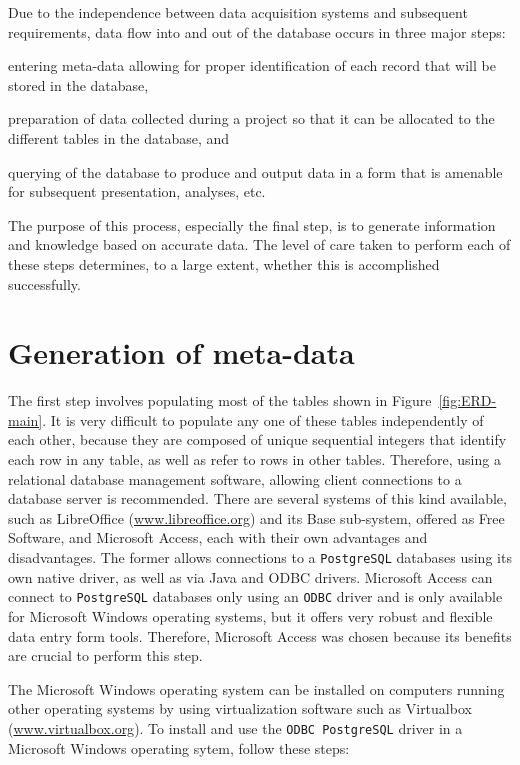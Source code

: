 \documentclass[12pt,letterpaper,titlepage,headings=small,numbers=noenddot]%
{scrartcl}
\begin{document}
Due to the independence between data acquisition systems and subsequent
requirements, data flow into and out of the database occurs in three major
steps:
\begin{inparaenum}[1)]
\item entering meta-data allowing for proper identification of each record
  that will be stored in the database,
\item preparation of data collected during a project so that it can be
  allocated to the different tables in the database, and
\item querying of the database to produce and output data in a form that is
  amenable for subsequent presentation, analyses, etc.
\end{inparaenum}

The purpose of this process, especially the final step, is to generate
information and knowledge based on accurate data.  The level of care taken
to perform each of these steps determines, to a large extent, whether this
is accomplished successfully.


\section{Generation of meta-data}
\label{sec:generation-meta-data}

The first step involves populating most of the tables shown in
Figure~\ref{fig:ERD-main}.  It is very difficult to populate any one of
these tables independently of each other, because they are composed of
unique sequential integers that identify each row in any table, as well as
refer to rows in other tables.  Therefore, using a relational database
management software, allowing client connections to a database server is
recommended.  There are several systems of this kind available, such as
LibreOffice (\url{www.libreoffice.org}) and its Base sub-system, offered as
Free Software, and Microsoft Access, each with their own advantages and
disadvantages.  The former allows connections to a \texttt{PostgreSQL}
databases using its own native driver, as well as via Java and ODBC
drivers.  Microsoft Access can connect to \texttt{PostgreSQL} databases
only using an \texttt{ODBC} driver and is only available for Microsoft
Windows operating systems, but it offers very robust and flexible data
entry form tools.  Therefore, Microsoft Access was chosen because its
benefits are crucial to perform this step.

The Microsoft Windows operating system can be installed on computers
running other operating systems by using virtualization software such as
Virtualbox (\url{www.virtualbox.org}).  To install and use the \texttt{ODBC
  PostgreSQL} driver in a Microsoft Windows operating sytem, follow these
steps:
\end{document}

